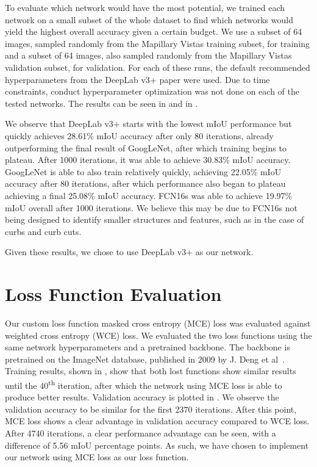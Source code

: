 To evaluate which network would have the most potential, we trained each network on a small subset of the whole dataset to find which networks would yield the highest overall accuracy given a certain budget.
We use a subset of 64 images, sampled randomly from the Mapillary Vistas training subset, for training and a subset of 64 images, also sampled randomly from the Mapillary Vistas validation subset, for validation.
For each of these runs, the default recommended hyperparameters from the DeepLab v3+ paper were used.
Due to time constraints, conduct hyperparameter optimization was not done on each of the tested networks.
The results can be seen in  and in .

We observe that DeepLab v3+ starts with the lowest mIoU performance but quickly achieves 28.61\% mIoU accuracy after only 80 iterations, already outperforming the final result of GoogLeNet, after which training begins to plateau.
After 1000 iterations, it was able to achieve 30.83\% mIoU accuracy.
GoogLeNet is able to also train relatively quickly, achieving 22.05\% mIoU accuracy after 80 iterations, after which performance also began to plateau achieving a final 25.08\% mIoU accuracy.
FCN16s was able to achieve 19.97\% mIoU overall after 1000 iterations.
We believe this may be due to FCN16s not being designed to identify smaller structures and features, such as in the case of curbs and curb cuts.

Given these results, we chose to use DeepLab v3+ as our network.




\section{Loss Function Evaluation}\label{section:experiments-loss}
Our custom loss function masked cross entropy (MCE) loss was evaluated against weighted cross entropy (WCE) loss.
We evaluated the two loss functions using the same network hyperparameters and a pretrained backbone.
The backbone is pretrained on the ImageNet database, published in 2009 by J. Deng et al~\cite{imagenet}.
Training results, shown in , show that both lost functions show similar results until the 40\textsuperscript{th} iteration, after which the network using MCE loss is able to produce better results.
Validation accuracy is plotted in .
We observe the validation accuracy to be similar for the first 2370 iterations.
After this point, MCE loss shows a clear advantage in validation accuracy compared to WCE loss.
After 4740 iterations, a clear performance advantage can be seen, with a difference of 5.56 mIoU percentage points.
As such, we have chosen to implement our network using MCE loss as our loss function.

